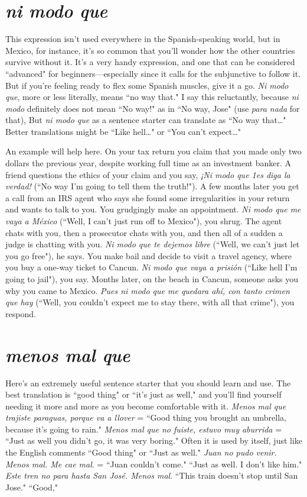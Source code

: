 \section{\emph{ni modo que}}

This expression isn't used everywhere in the Spanish-speaking
world, but in Mexico, for instance, it's so common that you'll wonder
how the other countries survive without it. It's a very handy expression, and one that can be considered ``advanced" for beginners---especially since it calls for the subjunctive to follow it. But if you're feeling
ready to flex some Spanish muscles, give it a go. \emph{Ni modo que}, more or
less literally, means ``no way that." I say this reluctantly, because \emph{ni
modo} definitely does not mean ``No way!" as in ``No way, Jose" (use
\emph{para nada} for that), But \emph{ni modo que} as a sentence starter can translate as ``No way that\ldots{}" Better translations might be ``Like hell\ldots{}"
or ``You can't expect\ldots{}"

An example will help here. On your tax return you claim that
you made only two dollars the previous year, despite working full time
as an investment banker. A friend questions the ethics of your claim
and you say, \emph{¡Ni modo que 1es diga la verdad!} (``No way I'm going to
tell them the truth!"). A few months later you get a call from an IRS
agent who says she found some irregularities in your return and wants
to talk to you. You grudgingly make an appointment. \emph{Ni modo que me
vaya a México} (``Well, I can't just run off to Mexico"), you shrug. The
agent chats with you, then a prosecutor chats with you, and then all of
a sudden a judge is chatting with you. \emph{Ni modo que te dejemos libre}
(``Well, we can't just let you go free"), he says. You make bail and decide to visit a travel agency, where you buy a one-way ticket to Cancun. \emph{Ni modo que vaya a prisión} (``Like hell I'm going to jail"), you
say. Months later, on the beach in Cancun, someone asks you why you
came to Mexico. \emph{Pues ni modo que me quedara ahí, con tanto crimen
que hay} (``Well, you couldn't expect me to stay there, with all that
crime"), you respond.

\section{\emph{menos mal que}}

Here's an extremely useful sentence starter that you should
learn and use. The best translation is ``good thing" or ``it's just as
well," and you'll find yourself needing it more and more as you become
comfortable with it. \emph{Menos mal que trajiste paraguas, porque va a
llover} = ``Good thing you brought an umbrella, because it's going to
rain." \emph{Menos mal que no fuiste, estuvo muy aburrida} = ``Just as well
you didn't go, it was very boring." Often it is used by itself, just like
the English comments ``Good thing" or ``Just as well." \emph{Juan no pudo
venir. Menos mal. Me cae mal}. = ``Juan couldn't come." ``Just as well.
I don't like him." \emph{Este tren no para hasta San José. Menos mal}.
``This train doesn't stop until San Jose." ``Good,"

